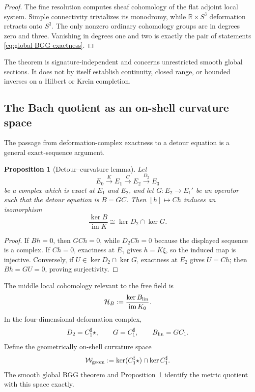 \documentclass[11pt]{article}
\newtheorem{proposition}[theorem]{Proposition}
\theoremstyle{definition}
\theoremstyle{remark}
\newcommand{\R}{\mathbb R}
\newcommand{\im}{\operatorname{im}}
\begin{document}
\begin{proof}
The fine resolution computes sheaf cohomology of the flat adjoint local
system.  Simple connectivity trivializes its monodromy, while
$\R\times S^3$ deformation retracts onto $S^3$.  The only nonzero ordinary
cohomology groups are in degrees zero and three.  Vanishing in degrees one
and two is exactly the pair of statements
\eqref{eq:global-BGG-exactness}.
\end{proof}

The theorem is signature-independent and concerns unrestricted smooth
global sections.  It does not by itself establish continuity, closed range,
or bounded inverses on a Hilbert or Krein completion.

\subsection{The Bach quotient as an on-shell curvature space}

The passage from deformation-complex exactness to a detour equation is a
general exact-sequence argument.

\begin{proposition}[Detour--curvature lemma]\label{prop:detour-curvature}
Let
\begin{equation}
 E_0\xrightarrow{K}E_1\xrightarrow{C}E_2
 \xrightarrow{D_2}E_3
\end{equation}
be a complex which is exact at $E_1$ and $E_2$, and let $G:E_2\to E_1'$ be
an operator such that the detour equation is $B=GC$.  Then $[h]\mapsto Ch$
induces an isomorphism
\begin{equation}\label{eq:abstract-detour-curvature}
 \boxed{
 \frac{\ker B}{\im K}
 \cong \ker D_2\cap\ker G.}
\end{equation}
\end{proposition}

\begin{proof}
If $Bh=0$, then $GCh=0$, while $D_2Ch=0$ because the displayed sequence is
a complex.  If $Ch=0$, exactness at $E_1$ gives $h=K\xi$, so the induced map
is injective.  Conversely, if $U\in\ker D_2\cap\ker G$, exactness at $E_2$
gives $U=Ch$; then $Bh=GU=0$, proving surjectivity.
\end{proof}

The middle local cohomology relevant to the free field is
\begin{equation}\label{eq:local-middle}
 \mathcal H_B:=\frac{\ker B_{\rm lin}}{\im K_0}.
\end{equation}
In the four-dimensional deformation complex,
\begin{equation}
 D_2=C_1^\sharp\star,
 \qquad G=C_1^\sharp,
 \qquad B_{\rm lin}=GC_1.
\end{equation}
Define the geometrically on-shell curvature space
\begin{equation}\label{eq:Wgeom}
 \mathcal W_{\rm geom}
 :=\ker(C_1^\sharp\star)\cap\ker C_1^\sharp.
\end{equation}
The smooth global BGG theorem and
Proposition~\ref{prop:detour-curvature} identify the metric quotient with
this space exactly.
\end{document}

